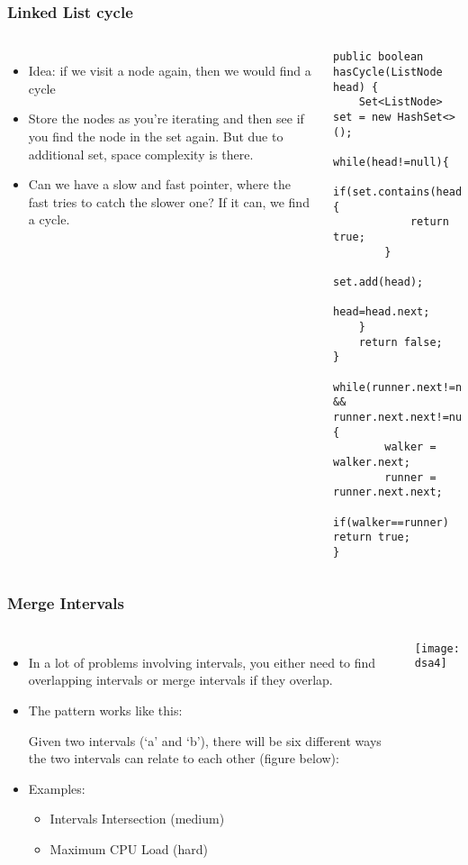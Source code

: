 \begin{frame}[fragile]
	\frametitle{Linked List cycle}
	
	\begin{columns}[T]
			\begin{itemize}
				\item  Idea: if we visit a node again, then we would find a cycle 
				\item  Store the nodes as you’re iterating and then see if you find the node in the set again.  But due to additional set, space complexity is there.
				\item Can we have a slow and fast pointer, where the fast tries to catch the slower one? If it can, we find a cycle.

			\end{itemize}
			
		
\begin{lstlisting}
public boolean hasCycle(ListNode head) { 
    Set<ListNode> set = new HashSet<>(); 
    while(head!=null){ 
        if(set.contains(head)){ 
            return true; 
        } 
        set.add(head); 
        head=head.next; 
    } 
    return false; 
} 			

while(runner.next!=null && runner.next.next!=null) { 
        walker = walker.next; 
        runner = runner.next.next; 
        if(walker==runner) return true; 
} 	
\end{lstlisting}			
	\end{columns}		
\end{frame}

\begin{frame}[fragile]
	\frametitle{Merge Intervals}
	\begin{columns}[T]
			\begin{itemize}
				\item In a lot of problems involving intervals, you either need to find overlapping intervals or merge intervals if they overlap. 
				\item The pattern works like this:

Given two intervals (‘a’ and ‘b’), there will be six different ways the two intervals can relate to each other (figure below):
				\item Examples:
			\begin{itemize}
				\item Intervals Intersection (medium)
				\item Maximum CPU Load (hard)
			\end{itemize}

			\end{itemize}
			
		
\begin{center}
\texttt{[image: dsa4]}
\end{center}		
		\end{columns}		
\end{frame}

